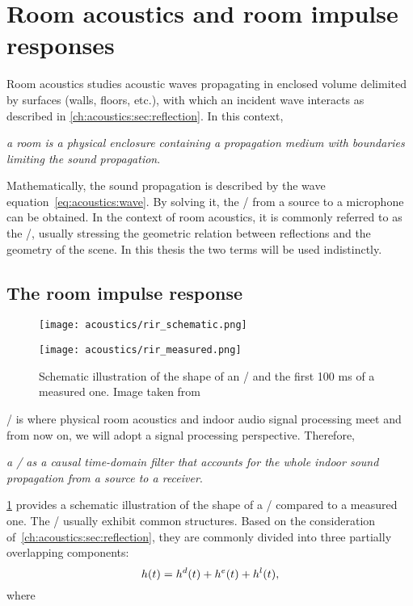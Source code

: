 \section{Room acoustics and room impulse responses}\label{ch:acoustics:sec:rir}
Room acoustics studies acoustic waves propagating in enclosed volume delimited by surfaces (walls, floors, etc.), with which an incident wave interacts as described in \cref{ch:acoustics:sec:reflection}.
In this context,\begin{center}
    \textit{a \textit{room} is a physical enclosure containing a propagation medium with boundaries limiting the sound propagation}.
\end{center}%
Mathematically, the sound propagation is described by the wave equation~\eqref{eq:acoustics:wave}.
By solving it, the \AIRdef/
from a source to a microphone can be obtained.
In the context of room acoustics, it is commonly referred to as the \RIRdef/, usually stressing
the geometric relation between reflections and the geometry of the scene.
In this thesis the two terms will be used indistinctly.

\subsection{The room impulse response}\label{ch:acoustics:subsec:rir}
\begin{figure}[t]
    \begin{fullwidth}

        \begin{minipage}[b]{.5\textwidth}
            \centering
            \texttt{[image: acoustics/rir\_schematic.png]}
        \end{minipage}%
        \begin{minipage}[b]{.5\textwidth}
        \centering
        \texttt{[image: acoustics/rir\_measured.png]}
    \end{minipage}
    \caption{Schematic illustration of the shape of an \RIR/ and the first 100 ms of a measured one. Image taken from~}
    \label{fig:acoustics:rir}
    \end{fullwidth}
\end{figure}
\RIRdef/ is where physical room acoustics and indoor audio signal processing meet and from now on, we will adopt a signal processing perspective.
Therefore,
\begin{center}
\textit{a \RIR/ as a causal time-domain filter that accounts for the whole indoor sound propagation from a source to a receiver}.
\end{center}
\cref{fig:acoustics:rir} provides a schematic illustration of the shape of a \RIR/ compared to a measured one.
The \RIRs/ usually exhibit common structures.
Based on the consideration of~\cref{ch:acoustics:sec:reflection}, they are commonly divided into three partially overlapping components:
\begin{equation}\label{eq:acoustics:rir_full}
h(t) = h^d(t) + h^e(t) + h^l(t)
,
\end{equation}
where

